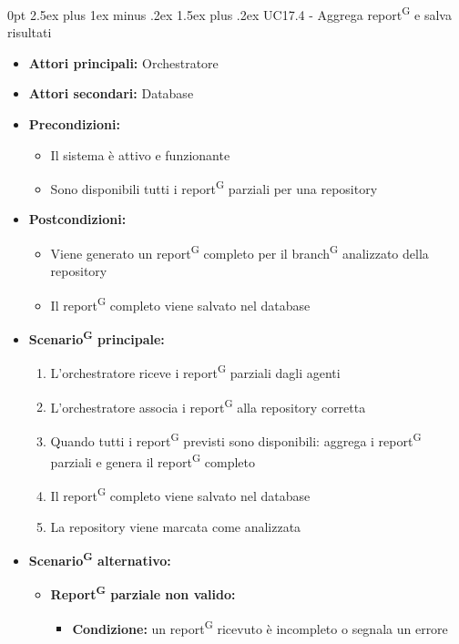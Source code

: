 \documentclass[a4paper, 11pt]{article}
\makeatletter
\renewcommand\paragraph{\@startsection{paragraph}{4}
  {0pt}
  {2.5ex plus 1ex minus .2ex}
  {1.5ex plus .2ex}
  {\normalfont\normalsize\bfseries\color{AccentDark}}}
\makeatother
\begin{document}
\paragraph{UC17.4 - Aggrega report\textsuperscript{G} e salva risultati} \label{UC17.4}
\begin{itemize}
	\item \textbf{Attori principali:} Orchestratore
	\item \textbf{Attori secondari:}  Database
	\item \textbf{Precondizioni:}
	\begin{itemize}
		\item Il sistema è attivo e funzionante
		\item Sono disponibili tutti i report\textsuperscript{G} parziali per una repository
	\end{itemize}
	\item \textbf{Postcondizioni:}
	\begin{itemize}
		\item Viene generato un report\textsuperscript{G} completo per il branch\textsuperscript{G} analizzato della repository
		\item Il report\textsuperscript{G} completo viene salvato nel database
	\end{itemize}
	\item \textbf{Scenario\textsuperscript{G} principale:}
	\begin{enumerate}
		\item L'orchestratore riceve i report\textsuperscript{G} parziali dagli agenti
		\item L'orchestratore associa i report\textsuperscript{G} alla repository corretta
		\item Quando tutti i report\textsuperscript{G} previsti sono disponibili: aggrega i report\textsuperscript{G} parziali e genera il report\textsuperscript{G} completo
		\item Il report\textsuperscript{G} completo viene salvato nel database
		\item La repository viene marcata come analizzata
	\end{enumerate}
	\item \textbf{Scenario\textsuperscript{G} alternativo:}
	\begin{itemize}
		\item \textbf{Report\textsuperscript{G} parziale non valido:}
			\begin{itemize}
				\item \textbf{Condizione:} un report\textsuperscript{G} ricevuto è incompleto o segnala un errore

\end{itemize}
\end{itemize}
\end{itemize}
\end{document}
